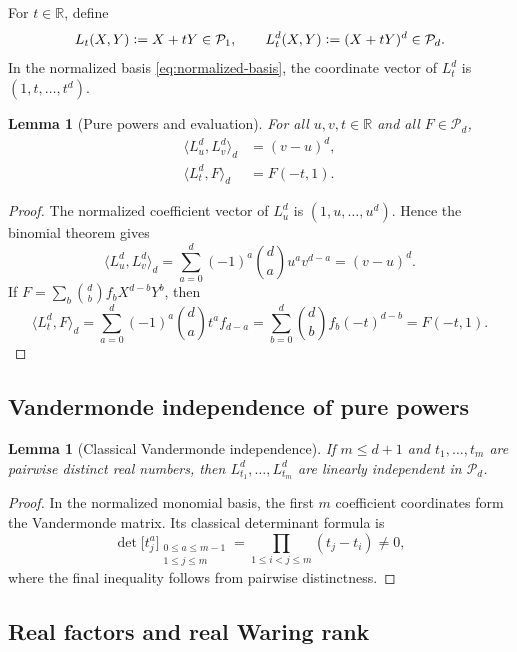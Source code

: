 \documentclass[11pt,letterpaper,reqno]{amsart}
\numberwithin{equation}{section}
\newtheorem{lemma}[theorem]{Lemma}
\theoremstyle{definition}
\newcommand{\RR}{\mathbb{R}}
\newcommand{\cP}{\mathcal{P}}
\newcommand{\defeq}{\mathrel{\vcentcolon=}}
\begin{document}
For \(t\in\RR\), define
\[
 L_t(X,Y)\defeq X+tY\in\cP_1,
 \qquad
 L_t^d(X,Y)\defeq(X+tY)^d\in\cP_d.
\]
In the normalized basis \eqref{eq:normalized-basis}, the coordinate
vector of \(L_t^d\) is \((1,t,\ldots,t^d)\).

\begin{lemma}[Pure powers and evaluation]\label{lem:apolar-identities}
For all \(u,v,t\in\RR\) and all \(F\in\cP_d\),
\begin{align}
 \langle L_u^d,L_v^d\rangle_d
 &= (v-u)^d, \label{eq:pure-power-pairing}\\
 \langle L_t^d,F\rangle_d
 &= F(-t,1). \label{eq:evaluation}
\end{align}
\end{lemma}

\begin{proof}
The normalized coefficient vector of \(L_u^d\) is
\((1,u,\ldots,u^d)\).  Hence the binomial theorem gives
\[
 \langle L_u^d,L_v^d\rangle_d
 =\sum_{a=0}^d(-1)^a\binom da u^av^{d-a}=(v-u)^d.
\]
If \(F=\sum_b\binom db f_bX^{d-b}Y^b\), then
\[
 \langle L_t^d,F\rangle_d
 =\sum_{a=0}^d(-1)^a\binom da t^af_{d-a}
 =\sum_{b=0}^d\binom db f_b(-t)^{d-b}=F(-t,1).
\]
\end{proof}

\subsection{Vandermonde independence of pure powers}

\begin{lemma}[Classical Vandermonde independence]\label{lem:pure-power-independence}
If \(m\le d+1\) and \(t_1,\ldots,t_m\) are pairwise distinct real
numbers, then \(L_{t_1}^d,\ldots,L_{t_m}^d\) are linearly independent in
\(\cP_d\).
\end{lemma}

\begin{proof}
In the normalized monomial basis, the first \(m\) coefficient coordinates
form the Vandermonde matrix.  Its classical determinant formula
\cite{MaconSpitzbart1958} is
\[
 \det\bigl[t_j^a\bigr]_{
 \substack{0\le a\le m-1\\1\le j\le m}}
 =\prod_{1\le i<j\le m}(t_j-t_i)\ne0,
\]
where the final inequality follows from pairwise distinctness.
\end{proof}

\subsection{Real factors and real Waring rank}
\end{document}
